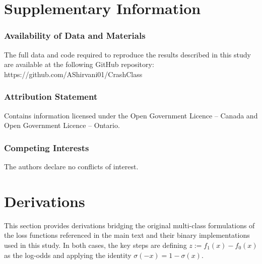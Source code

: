 \documentclass{article}
\begin{document}
\section*{Supplementary Information}
\subsubsection*{Availability of Data and Materials}
The full data and code required to reproduce the results described in this study are available at the following GitHub repository: https://github.com/AShirvani01/CrashClass

\subsubsection*{Attribution Statement}
Contains information licensed under the Open Government Licence – Canada and Open Government Licence – Ontario.
\subsubsection*{Competing Interests}
The authors declare no conflicts of interest.



\newpage



\newpage

\appendix
\section{Derivations}
\label{appendix:derivations}
This section provides derivations bridging the original multi-class formulations of the loss functions referenced in the main text and their binary implementations used in this study. In both cases, the key steps are defining $z := f_1(x) - f_0(x)$ as the log-odds and applying the identity $\sigma(-x) = 1 - \sigma(x)$.
\end{document}

